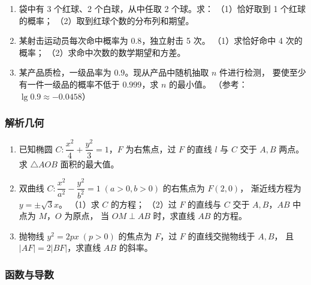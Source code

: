 \begin{enumerate}
  \item[★] 袋中有 3 个红球、2 个白球，从中任取 2 个球。求：
  （1）恰好取到 1 个红球的概率；
  （2）取到红球个数的分布列和期望。
  \vspace{1.5cm}

  \item[★★] 某射击运动员每次命中概率为 $0.8$，独立射击 5 次。
  （1）求恰好命中 4 次的概率；
  （2）求命中次数的数学期望和方差。
  \vspace{1.5cm}

  \item[★★] 某产品质检，一级品率为 $0.9$。现从产品中随机抽取 $n$ 件进行检测，
  要使至少有一件一级品的概率不低于 $0.999$，求 $n$ 的最小值。
  （参考：$\lg 0.9 \approx -0.0458$）
  \vspace{1.5cm}
\end{enumerate}

\subsubsection{解析几何}

\begin{enumerate}
  \item[★] 已知椭圆 $C:\dfrac{x^2}{4}+\dfrac{y^2}{3}=1$，$F$ 为右焦点，过 $F$ 的直线 $l$ 与
  $C$ 交于 $A,B$ 两点。求 $\triangle AOB$ 面积的最大值。
  \vspace{2cm}

  \item[★★] 双曲线 $C:\dfrac{x^2}{a^2}-\dfrac{y^2}{b^2}=1\;(a>0,b>0)$ 的右焦点为 $F(2,0)$，
  渐近线方程为 $y=\pm\sqrt{3}x$。
  （1）求 $C$ 的方程；
  （2）过 $F$ 的直线与 $C$ 交于 $A,B$，$AB$ 中点为 $M$，$O$ 为原点，
  当 $OM\perp AB$ 时，求直线 $AB$ 的方程。
  \vspace{2cm}

  \item[★★★] 抛物线 $y^2=2px\;(p>0)$ 的焦点为 $F$，过 $F$ 的直线交抛物线于 $A,B$，
  且 $|AF|=2|BF|$，求直线 $AB$ 的斜率。
  \vspace{2cm}
\end{enumerate}

\subsubsection{函数与导数}


